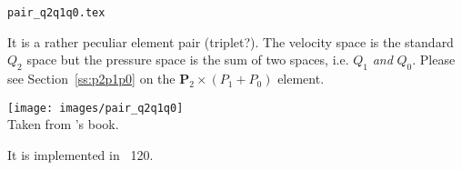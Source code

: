 \begin{flushright} {\tiny {\color{gray} \tt  pair\_q2q1q0.tex}} \end{flushright}

It is a rather peculiar element pair (triplet?). The velocity space is the standard $Q_2$ space
but the pressure space is the sum of two spaces, i.e. $Q_1$ {\it and} $Q_0$.
Please see Section~\ref{ss:p2p1p0} on the ${\bm P}_2\times (P_1+P_0)$ element.

\begin{center}
\texttt{[image: images/pair\_q2q1q0]}\\
{\captionfont Taken from \textcite{grsa}'s book.}
\end{center}

It is implemented in \stone~120.
